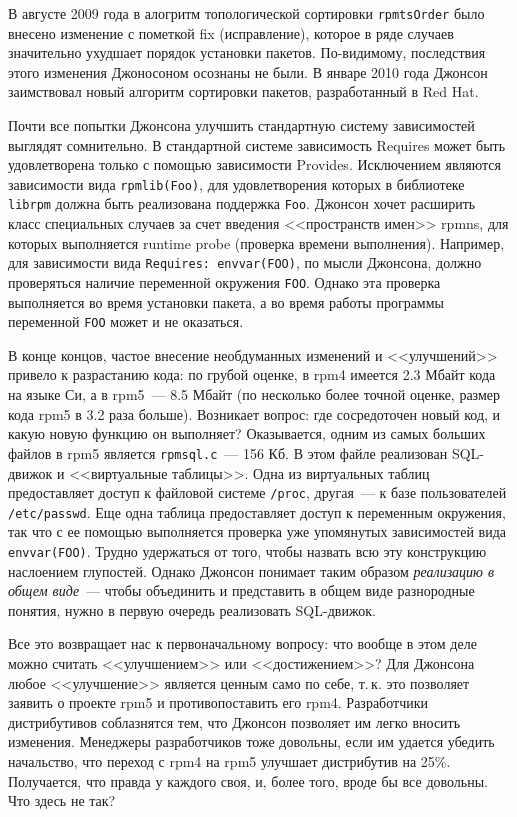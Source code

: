 \documentclass[russian,a4paper,12pt,titlepage]{article}
\begin{document}
В августе 2009 года в алогритм топологической сортировки \verb|rpmtsOrder| было внесено изменение с пометкой fix
(исправление), которое в ряде случаев значительно ухудшает порядок установки пакетов.  По-видимому, последствия
этого изменения Джоносоном осознаны не были.  В январе 2010 года Джонсон заимствовал новый алгоритм сортировки
пакетов, разработанный в Red Hat.

Почти все попытки Джонсона улучшить стандартную систему зависимостей выглядят сомнительно.  В стандартной системе
зависимость Requires может быть удовлетворена только с помощью зависимости Provides.  Исключением являются зависимости
вида \verb|rpmlib(Foo)|, для удовлетворения которых в библиотеке \verb|librpm| должна быть реализована поддержка \verb|Foo|.
Джонсон хочет расширить класс специальных случаев за счет введения <<пространств имен>> rpmns, для которых выполняется
runtime probe (проверка времени выполнения).  Например, для зависимости вида \verb|Requires: envvar(FOO)|, по мысли Джонсона,
должно проверяться наличие переменной окружения \verb|FOO|.  Однако эта проверка выполняется во время установки пакета,
а во время работы программы переменной \verb|FOO| может и не оказаться.

В конце концов, частое внесение необдуманных изменений и <<улучшений>> привело к разрастанию кода: по грубой оценке,
в rpm4 имеется 2.3 Мбайт кода на языке Си, а в rpm5~--- 8.5 Мбайт (по несколько более точной оценке, размер кода
rpm5 в 3.2 раза больше).  Возникает вопрос: где сосредоточен новый код, и какую новую функцию он выполняет?
Оказывается, одним из самых больших файлов в rpm5 является \verb|rpmsql.c|~--- 156 Кб.  В этом файле
реализован SQL-движок и <<виртуальные таблицы>>.  Одна из виртуальных таблиц предоставляет
доступ к файловой системе \verb|/proc|, другая~--- к базе пользователей \verb|/etc/passwd|.  Еще одна таблица
предоставляет доступ к переменным окружения, так что с ее помощью выполняется проверка уже упомянутых зависимостей
вида \verb|envvar(FOO)|.  Трудно удержаться от того, чтобы назвать всю эту конструкцию наслоением глупостей.
Однако Джонсон понимает таким образом \emph{реализацию в общем виде}~--- чтобы объединить и представить в общем виде
разнородные понятия, нужно в первую очередь реализовать SQL-движок.

Все это возвращает нас к первоначальному вопросу: что вообще в этом деле можно считать <<улучшением>> или <<достижением>>?
Для Джонсона любое <<улучшение>> является ценным само по себе, т.\,к. это позволяет заявить о проекте rpm5 и противопоставить
его rpm4.  Разработчики дистрибутивов соблазнятся тем, что Джонсон позволяет им легко вносить изменения.  Менеджеры разработчиков
тоже довольны, если им удается убедить начальство, что переход с rpm4 на rpm5 улучшает дистрибутив на 25\%.
Получается, что правда у каждого своя, и, более того, вроде бы все довольны.  Что здесь не так?
\end{document}
